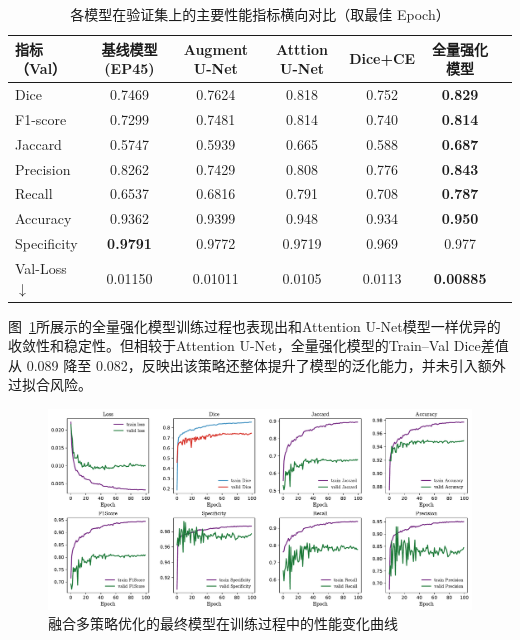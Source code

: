 \begin{table}[!htbp]
    \centering
    \caption{各模型在验证集上的主要性能指标横向对比（取最佳 Epoch）}
    \label{tab:model_summary}
    \begin{tabular}{lcccccc}
        \toprule
        指标（Val） & 基线模型(EP45) & Augment U-Net & Atttion U-Net & Dice+CE & 全量强化模型 \\
        \midrule
        Dice        & 0.7469 & 0.7624 & 0.818 & 0.752 & \textbf{0.829} \\
        F1-score    & 0.7299 & 0.7481 & 0.814 & 0.740 & \textbf{0.814} \\
        Jaccard     & 0.5747 & 0.5939 & 0.665 & 0.588 & \textbf{0.687} \\
        Precision   & 0.8262 & 0.7429 & 0.808 & 0.776 & \textbf{0.843} \\
        Recall      & 0.6537 & 0.6816 & 0.791 & 0.708 & \textbf{0.787} \\
        Accuracy    & 0.9362 & 0.9399 & 0.948 & 0.934 & \textbf{0.950} \\
        Specificity & \textbf{0.9791} & 0.9772 & 0.9719 & 0.969 & 0.977 \\
        Val-Loss $\downarrow$ & 0.01150 & 0.01011 & 0.0105 & 0.0113 & \textbf{0.00885} \\
        \bottomrule
    \end{tabular}
\end{table}

图~\ref{fig:all_in_is_art}所展示的全量强化模型训练过程也表现出和Attention U-Net模型一样优异的收敛性和稳定性。但相较于Attention U-Net，全量强化模型的Train–Val Dice差值从 0.089 降至 0.082，反映出该策略还整体提升了模型的泛化能力，并未引入额外过拟合风险。

\begin{figure}[!htbp]
    \centering
    \includegraphics[width=\textwidth]{fig/allin_unet_metrics.pdf}
    \caption{融合多策略优化的最终模型在训练过程中的性能变化曲线}
    \label{fig:all_in_is_art}
\end{figure}

